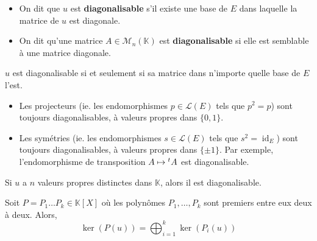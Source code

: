 	\begin{definition}
		\begin{itemize}
			\item On dit que $u$ est \textbf{diagonalisable} s'il existe une base de $E$ dans laquelle la matrice de $u$ est diagonale.
			\item On dit qu'une matrice $A \in \mathcal{M}_n(\mathbb{K})$ est \textbf{diagonalisable} si elle est semblable à une matrice diagonale.
		\end{itemize}
	\end{definition}

	\begin{remark}
		$u$ est diagonalisable si et seulement si sa matrice dans n'importe quelle base de $E$ l'est.
	\end{remark}


	\begin{example}
		\begin{itemize}
			\item Les projecteurs (ie. les endomorphismes $p \in \mathcal{L}(E)$ tels que $p^2 = p$) sont toujours diagonalisables, à valeurs propres dans $\{ 0, 1 \}$.
			\item Les symétries (ie. les endomorphismes $s \in \mathcal{L}(E)$ tels que $s^2 = \operatorname{id}_E$) sont toujours diagonalisables, à valeurs propres dans $\{ \pm 1 \}$. Par exemple, l'endomorphisme de transposition $A \mapsto \mathstrut ^t A$ est diagonalisable.
		\end{itemize}
	\end{example}


	\begin{proposition}
		Si $u$ a $n$ valeurs propres distinctes dans $\mathbb{K}$, alors il est diagonalisable.
	\end{proposition}


	\begin{theorem}
		Soit $P = P_1 \dots P_k \in \mathbb{K}[X]$ où les polynômes $P_1, \dots, P_k$ sont premiers entre eux deux à deux. Alors,
		\[ \ker(P(u)) = \bigoplus_{i=1}^k \ker(P_i(u)) \]
	\end{theorem}


